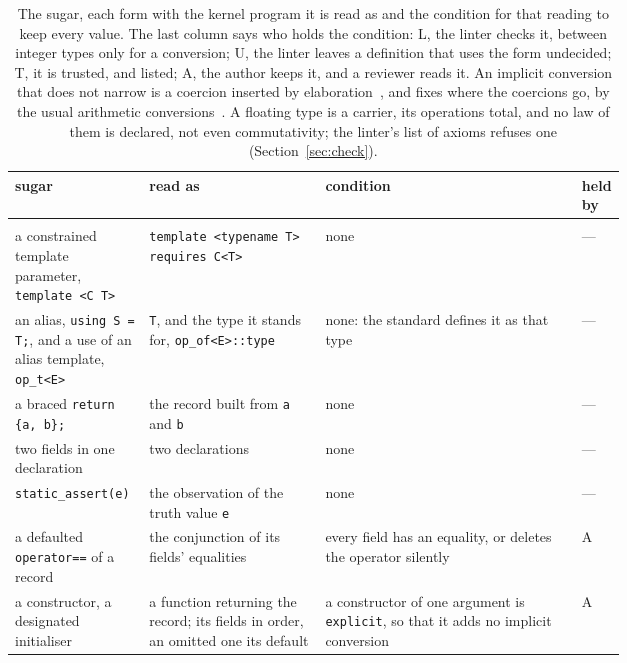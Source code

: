 \begingroup
\small
\begin{longtable}{@{}>{\raggedright\arraybackslash}p{0.22\linewidth}>{\raggedright\arraybackslash}p{}>{\raggedright\arraybackslash}p{0.42\linewidth}>{\raggedright\arraybackslash}p{0.07\linewidth}@{}}
\toprule
sugar & read as & condition & held by \\
\midrule
\endhead
\bottomrule
\endfoot
\bottomrule
\caption{The sugar, each form with the kernel program it is read as and the condition for that reading to keep every value.
The last column says who holds the condition: L, the linter checks it, between integer types only for a conversion; U, the linter leaves a definition that uses the form undecided; T, it is trusted, and listed; A, the author keeps it, and a reviewer reads it.
An implicit conversion that does not narrow is a coercion inserted by elaboration~\cite{reynolds1980conversions,breazutannen1991inheritance}, and \Cpp{} fixes where the coercions go, by the usual arithmetic conversions~\cite[\texttt{expr.arith.conv}]{cpp23standard}.
A floating type is a carrier, its operations total, and no law of them is declared, not even commutativity; the linter's list of axioms refuses one (Section~\ref{sec:check}).}
\label{tab:derived}
\endlastfoot
\multicolumn{4}{@{}l}{\emph{written another way, no condition}} \\
a constrained template parameter, \texttt{template <C T>} & \texttt{template <typename T> requires C<T>} & none & --- \\
an alias, \texttt{using S = T;}, and a use of an alias template, \texttt{op\_t<E>} & \texttt{T}, and the type it stands for, \texttt{op\_of<E>::type} & none: the standard defines it as that type~\cite[\texttt{temp.alias}]{cpp23standard} & --- \\
a braced \texttt{return \{a, b\};} & the record built from \texttt{a} and \texttt{b} & none & --- \\
two fields in one declaration & two declarations & none & --- \\
\texttt{static\_assert(e)} & the observation of the truth value \texttt{e} & none & --- \\
a defaulted \texttt{operator==} of a record & the conjunction of its fields' equalities & every field has an equality, or \Cpp{} deletes the operator silently & A \\
a constructor, a designated initialiser & a function returning the record; its fields in order, an omitted one its default & a constructor of one argument is \texttt{explicit}, so that it adds no implicit conversion & A \\

\end{longtable}
